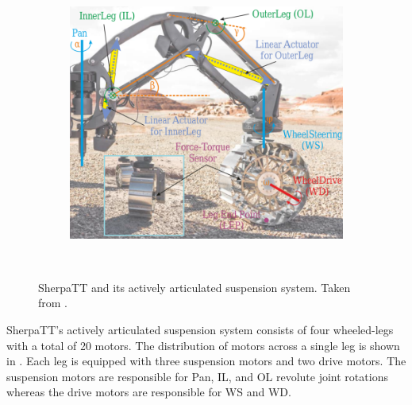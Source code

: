 \begin{figure}[h]
    \begin{subfigure}[t]{\subfigureWidth}
        \centering
            \includegraphics[height=\graphicsHeight]{sections/introduction/background/images/sherpatt-actively-articulated-suspension-sytem.png}
            \label{fig:sherpatt-actively-articulated-suspension-system}
    \end{subfigure}\\[0.8ex]
    \caption[SherpaTT]
    {SherpaTT and its actively articulated suspension system. Taken from  .}
    \label{}
\vspace{-2ex}
\end{figure}

SherpaTT's actively articulated suspension system consists of four wheeled-legs with a total of 20 motors. The distribution of motors across a single leg is shown in . Each leg is equipped with three suspension motors and two drive motors. The suspension motors are responsible for Pan, \ac{IL}, and \ac{OL} revolute joint rotations whereas the drive motors are responsible for \ac{WS} and \ac{WD}.
